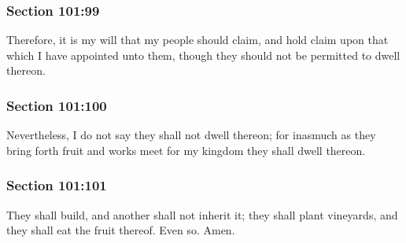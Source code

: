	\subsubsection{Section 101:99} %
		\label{DC101-99}

		Therefore, it is my will that my people should claim, and hold claim upon that which I have appointed unto them, though they should not be permitted to dwell thereon.


	\subsubsection{Section 101:100} %
		\label{DC101-100}

		Nevertheless, I do not say they shall not dwell thereon; for inasmuch as they bring forth fruit and works meet for my kingdom they shall dwell thereon.


	\subsubsection{Section 101:101} %
		\label{DC101-101}

		They shall build, and another shall not inherit it; they shall plant vineyards, and they shall eat the fruit thereof.  Even so.  Amen.

